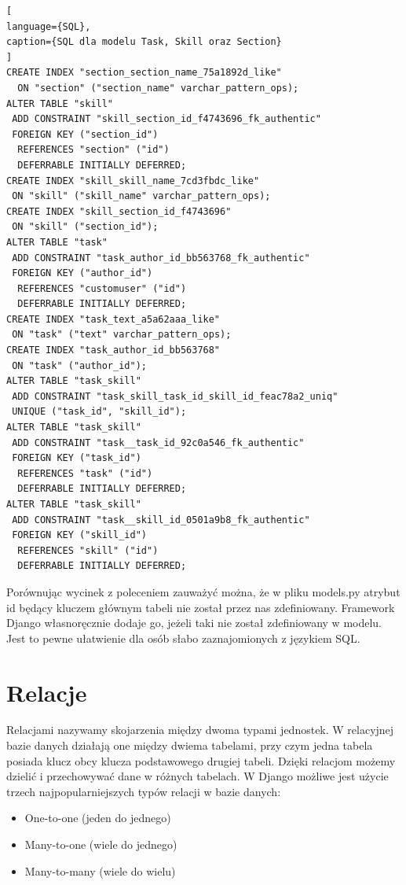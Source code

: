 \documentclass[oneside,polski,logo,indent]{amuthesis}
\begin{document}
\begin{enumerate}
\begin{enumerate}
\begin{lstlisting}[
language={SQL},
caption={SQL dla modelu Task, Skill oraz Section}
]
CREATE INDEX "section_section_name_75a1892d_like" 
  ON "section" ("section_name" varchar_pattern_ops);
ALTER TABLE "skill" 
 ADD CONSTRAINT "skill_section_id_f4743696_fk_authentic" 
 FOREIGN KEY ("section_id") 
  REFERENCES "section" ("id")
  DEFERRABLE INITIALLY DEFERRED;
CREATE INDEX "skill_skill_name_7cd3fbdc_like" 
 ON "skill" ("skill_name" varchar_pattern_ops);
CREATE INDEX "skill_section_id_f4743696" 
 ON "skill" ("section_id");
ALTER TABLE "task" 
 ADD CONSTRAINT "task_author_id_bb563768_fk_authentic" 
 FOREIGN KEY ("author_id") 
  REFERENCES "customuser" ("id") 
  DEFERRABLE INITIALLY DEFERRED;
CREATE INDEX "task_text_a5a62aaa_like" 
 ON "task" ("text" varchar_pattern_ops);
CREATE INDEX "task_author_id_bb563768" 
 ON "task" ("author_id");
ALTER TABLE "task_skill" 
 ADD CONSTRAINT "task_skill_task_id_skill_id_feac78a2_uniq" 
 UNIQUE ("task_id", "skill_id");
ALTER TABLE "task_skill" 
 ADD CONSTRAINT "task__task_id_92c0a546_fk_authentic" 
 FOREIGN KEY ("task_id")
  REFERENCES "task" ("id") 
  DEFERRABLE INITIALLY DEFERRED;
ALTER TABLE "task_skill" 
 ADD CONSTRAINT "task__skill_id_0501a9b8_fk_authentic" 
 FOREIGN KEY ("skill_id")
  REFERENCES "skill" ("id") 
  DEFERRABLE INITIALLY DEFERRED;
\end{lstlisting}

Porównując wycinek z poleceniem zauważyć można, że w pliku models.py atrybut id będący kluczem głównym tabeli nie został przez nas zdefiniowany. Framework Django własnoręcznie dodaje go, jeżeli taki nie został zdefiniowany w modelu. Jest to pewne ułatwienie dla osób słabo zaznajomionych z językiem SQL.

\section{Relacje}
Relacjami nazywamy skojarzenia między dwoma typami jednostek. W relacyjnej bazie danych działają one między dwiema tabelami, przy czym jedna tabela posiada klucz obcy klucza podstawowego drugiej tabeli. Dzięki relacjom możemy dzielić i przechowywać dane w różnych tabelach. W Django możliwe jest użycie trzech najpopularniejszych typów relacji w bazie danych:
\begin{itemize}
\item One-to-one (jeden do jednego)
\item Many-to-one (wiele do jednego)
\item Many-to-many (wiele do wielu)

\end{itemize}

\end{enumerate}
\end{enumerate}
\end{document}
